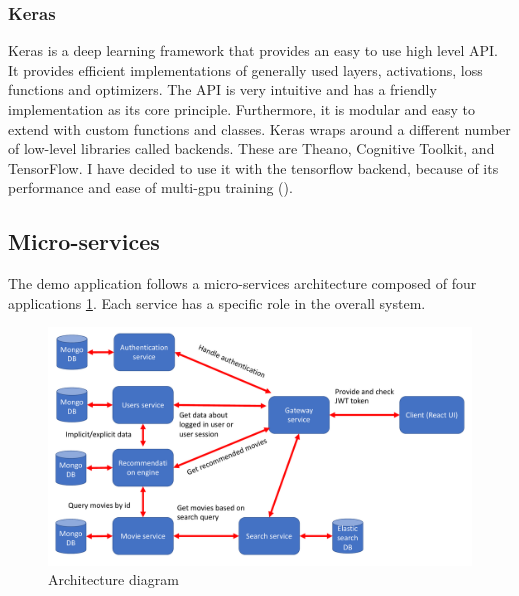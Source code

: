 \subsubsection{Keras}

Keras is a deep learning framework that provides an easy to use high level API. It provides efficient implementations of generally used layers, activations, loss functions and optimizers. The API is very intuitive and has a friendly implementation as its core principle. Furthermore, it is modular and easy to extend with custom functions and classes.
Keras wraps around a different number of low-level libraries called backends. These are Theano, Cognitive Toolkit, and TensorFlow. 
I have decided to use it with the tensorflow backend, because of its performance and ease of multi-gpu training (\citet{tensorflow2015-whitepaper}). 

\subsection{Micro-services}
The demo application follows a micro-services architecture composed of four applications \ref{architecture_diagram}. Each service has a specific role in the overall system. 

\begin{figure}[h!]
    \includegraphics[scale=0.4]{architecture_diagram}
    \caption{Architecture diagram}
    \label{architecture_diagram}
\end{figure}

